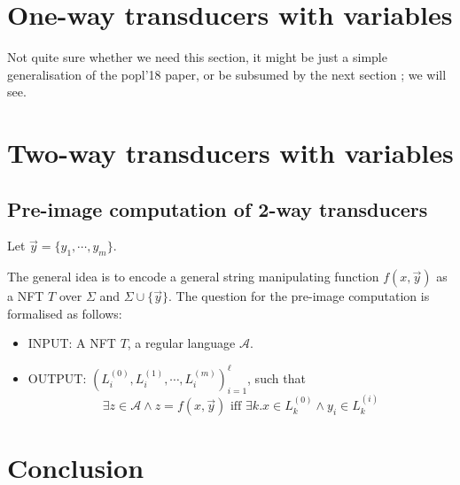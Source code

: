 \documentclass{llncs}
\newcommand{\tl}[1]{\color{blue} {TL: #1 :LT} \color{black}}
\newcommand{\tl}[1]{}
\begin{document}

\section{One-way transducers with variables}

Not quite sure whether we need this section, it might be just a simple generalisation of the popl'18 paper, or be subsumed by the next section ; we will see. 


\section{Two-way transducers with variables}

\subsection{Pre-image computation of 2-way transducers}  

Let $\vec{y}=\{y_1, \cdots, y_m\}$.

The general idea is to encode a general string manipulating function $f(x, \vec{y})$ as a NFT $T$ over $\Sigma$ and $\Sigma\cup\{\vec{y}\}$. The question for the pre-image computation is formalised as follows:
\begin{itemize}
	\item INPUT: A NFT $T$, a regular language $\mathcal{A}$. 
	\item OUTPUT: $(L^{(0)}_i, L^{(1)}_i, \cdots, L^{(m)}_i )_{i=1}^\ell$, such that 
	\[\exists z\in\mathcal{A} \wedge z=f(x, \vec{y})\mbox{ iff }\exists k. x\in L^{(0)}_k \wedge y_i\in L^{(i)}_k \]
\end{itemize}


%


\section{Conclusion}



\end{document}
